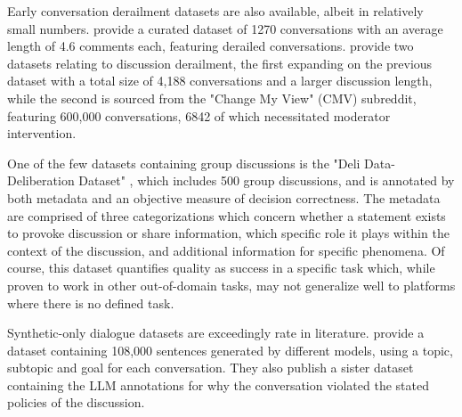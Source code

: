 Early conversation derailment datasets are also available, albeit in relatively small numbers. \cite{zhang-2018-gone-awry} provide a curated dataset of 1270 conversations with an average length of 4.6 comments each, featuring derailed conversations. \cite{chang-danescu-niculescu-mizil-2019-trouble} provide two datasets relating to discussion derailment, the first expanding on the previous dataset with a total size of 4,188 conversations and a larger discussion length, while the second is sourced from the "Change My View" (CMV) subreddit, featuring 600,000 conversations, 6842 of which necessitated moderator intervention.

One of the few datasets containing group discussions is the "Deli Data-Deliberation Dataset" \cite{karadzhov2023delidata}, which includes 500 group discussions, and is annotated by both metadata and an objective measure of decision correctness. The metadata are comprised of three categorizations which concern whether a statement exists to provoke discussion or share information, which specific role it plays within the context of the discussion, and additional information for specific phenomena. Of course, this dataset quantifies quality as success in a specific task which, while proven to work in other out-of-domain tasks, may not generalize well to platforms where there is no defined task.

Synthetic-only dialogue datasets are exceedingly rate in literature. \cite{lambert2024selfdirectedsyntheticdialoguesrevisions} provide a dataset containing  108,000 sentences generated by different models, using a topic, subtopic and goal for each conversation. They also publish a sister dataset containing the LLM annotations for why the conversation violated the stated policies of the discussion.



